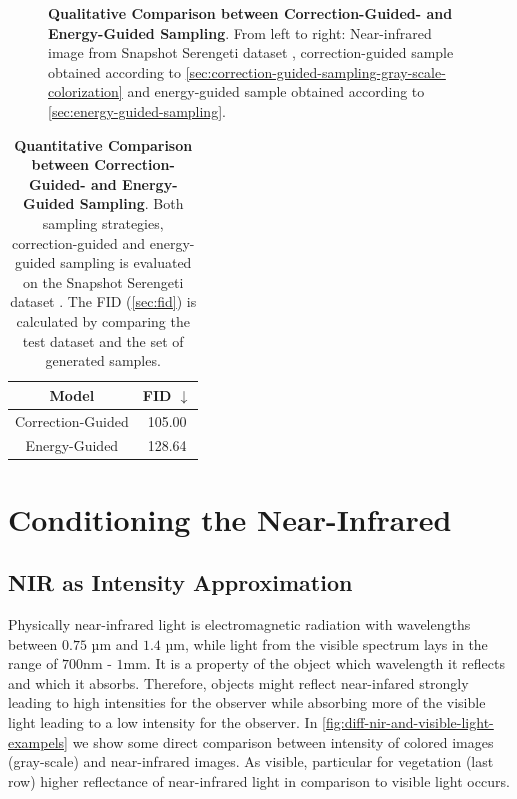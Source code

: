 \begin{figure}[htp!]
\begin{tabularx}{\textwidth}{Y Y Y !{\space} Y Y Y}
    \end{tabularx}
    \caption{
        \textbf{Qualitative Comparison between Correction-Guided- and Energy-Guided Sampling}.
        From left to right:
        Near-infrared image from Snapshot Serengeti dataset \parencite{serengeti},
        correction-guided sample obtained according to \autoref{sec:correction-guided-sampling-gray-scale-colorization}
        and
        energy-guided sample obtained according to \autoref{sec:energy-guided-sampling}.
    }
    \label{fig:qualitative-evaluation-loss-guided-vs-correction-guided}
\end{figure}

\begin{table}[htp!]
    \centering
    \begin{tabular}{c | c}
        Model             & FID  $\downarrow$ \\
        \hline\hline
        Correction-Guided & 105.00            \\
        Energy-Guided     & 128.64
    \end{tabular}
    \caption{
        \textbf{Quantitative Comparison between Correction-Guided- and Energy-Guided Sampling}.
        Both sampling strategies, correction-guided and energy-guided sampling is evaluated on the Snapshot Serengeti dataset \parencite{serengeti}.
        The FID (\autoref{sec:fid}) \parencite{ttur} is calculated by comparing the test dataset and the set of generated samples.
    }
    \label{fig:quantitative-evaluation-loss-guided-vs-correction-guided}
\end{table}



\section{Conditioning the Near-Infrared}
\subsection{NIR as Intensity Approximation}
\label{sec:nir-as-intensity-approximation-evaluation}
Physically near-infrared light is electromagnetic radiation with wavelengths between $0.75$ µm and $1.4$ µm, while light from the visible spectrum lays in the range of $700$nm - $1$mm.
It is a property of the object which wavelength it reflects and which it absorbs.
Therefore, objects might reflect near-infared strongly leading to high intensities for the observer while absorbing more of the visible light leading to a low intensity for the observer.
In \autoref{fig:diff-nir-and-visible-light-exampels} we show some direct comparison between intensity of colored images (gray-scale) and near-infrared images.
As visible, particular for vegetation (last row) higher reflectance of near-infrared light in comparison to visible light occurs.



